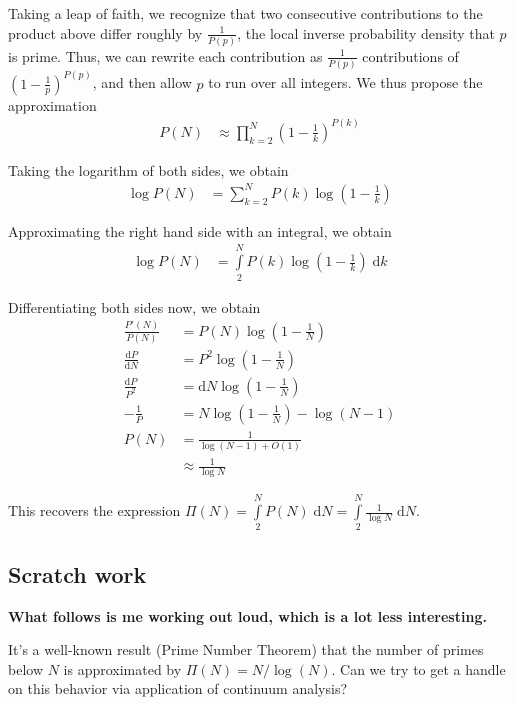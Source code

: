 \documentclass[10pt]{article}
\newcommand{\rd}[2]{\frac{\mathrm{d}#1}{\mathrm{d}#2}}
\begin{document}
Taking a leap of faith, we recognize that two consecutive contributions to the
product above differ roughly by $\frac{1}{P(p)}$, the local inverse probability
density that $p$ is prime. Thus, we can rewrite each contribution as
$\frac{1}{P(p)}$ contributions of $\left( 1 - \frac{1}{p} \right)^{P(p)}$, and
then allow $p$ to run over all integers. We thus propose the approximation
\begin{align}
    P(N) &\approx \prod_{k=2}^N\left( 1 - \frac{1}{k} \right)^{P(k)}
\end{align}

Taking the logarithm of both sides, we obtain
\begin{align}
    \log P(N) &= \sum\limits_{k=2}^{N}P(k)\log\left( 1 - \frac{1}{k} \right)
\end{align}

Approximating the right hand side with an integral, we obtain
\begin{align}
    \log P(N) &= \int\limits_{2}^{N}P(k)\log\left( 1 - \frac{1}{k}
    \right)\;\mathrm{d}k
\end{align}

Differentiating both sides now, we obtain
\begin{align}
    \frac{P'(N)}{P(N)} &= P(N)\log\left( 1 - \frac{1}{N} \right)\\
    \rd{P}{N} &= P^2\log\left( 1 - \frac{1}{N} \right)\\
    \frac{\mathrm{d}P}{P^2} &= \mathrm{d}N \log\left( 1 - \frac{1}{N} \right)\\
    -\frac{1}{P} &= N\log\left( 1 - \frac{1}{N} \right) - \log(N - 1)\\
    P(N) &= \frac{1}{\log(N - 1) + O(1)}\\
    &\approx \frac{1}{\log N}
\end{align}

This recovers the expression $\Pi(N) = \int\limits_{2}^{N}P(N)\;\mathrm{d}N =
\int\limits_{2}^{N}\frac{1}{\log N}\;\mathrm{d}N$.

\subsection{Scratch work}

\textbf{What follows is me working out loud, which is a lot less interesting.}

It's a well-known result (Prime Number Theorem) that the number of primes below
$N$ is approximated by $\Pi(N) = N/\log(N)$. Can we try to get a handle on this
behavior via application of continuum analysis?
\end{document}
